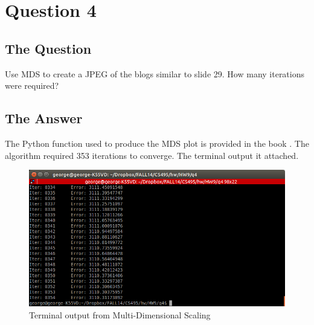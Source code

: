 \section{Question 4}

\subsection{The Question}

\begin{flushleft}

 Use MDS to create a JPEG of the blogs similar to slide 29.  
How many iterations were required?

\end{flushleft}
\subsection{The Answer}


The Python function used to produce the MDS plot is provided in the book \cite{PCI}. The algorithm required 353 iterations to converge. The terminal output it attached.




\begin{figure}
\centering
\includegraphics[width=\textwidth]{../q4/mds.png}
\caption{Terminal output from Multi-Dimensional Scaling}
\end{figure}

